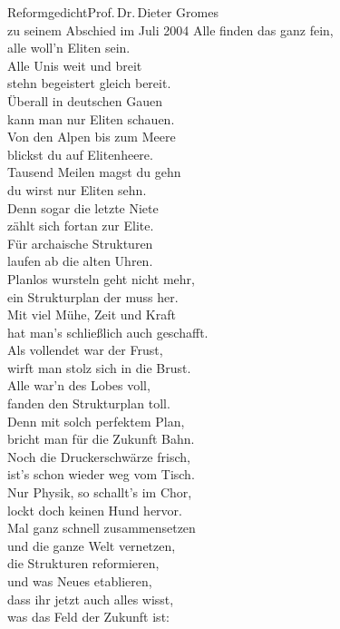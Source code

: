 \begin{lied*}{Reformgedicht}{Prof.\,Dr.\,Dieter Gromes\\zu seinem Abschied im Juli 2004}
Alle finden das ganz fein,\\
alle woll'n Eliten sein.\\
Alle Unis weit und breit\\
stehn begeistert gleich bereit.\\

Überall in deutschen Gauen\\
kann man nur Eliten schauen.\\
Von den Alpen bis zum Meere\\
blickst du auf Elitenheere.\\
Tausend Meilen magst du gehn\\
du wirst nur Eliten sehn.\\
Denn sogar die letzte Niete\\
zählt sich fortan zur Elite.\\

Für archaische Strukturen\\
laufen ab die alten Uhren.\\
Planlos wursteln geht nicht mehr,\\
ein Strukturplan der muss her.\\
Mit viel Mühe, Zeit und Kraft\\
hat man's schließlich auch geschafft.\\
Als vollendet war der Frust,\\
wirft man stolz sich in die Brust.\\
Alle war'n des Lobes voll,\\
fanden den Strukturplan toll.\\
Denn mit solch perfektem Plan,\\
bricht man für die Zukunft Bahn.\\

Noch die Druckerschwärze frisch,\\
ist's schon wieder weg vom Tisch.\\
\glqq Nur Physik\grqq, so schallt's im Chor,\\
\glqq lockt doch keinen Hund hervor.\grqq\\
Mal ganz schnell zusammensetzen\\
und die ganze Welt vernetzen,\\
die Strukturen reformieren,\\
und was Neues etablieren,\\
dass ihr jetzt auch alles wisst,\\
was das Feld der Zukunft ist:\\


\end{lied*}
